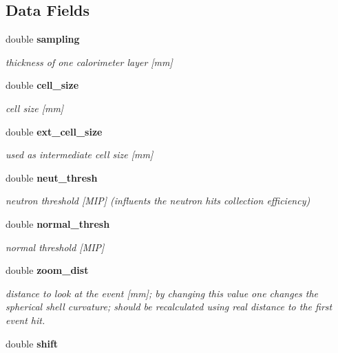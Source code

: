\subsection*{Data Fields}
\begin{DoxyCompactItemize}
\item 
double {\bf sampling}\label{classDeepAnalysis_1_1Detector_a5d4e2fd38f01156c20f84816433b369d}

\begin{DoxyCompactList}\small\item\em thickness of one calorimeter layer [mm] \end{DoxyCompactList}\item 
double {\bf cell\-\_\-size}\label{classDeepAnalysis_1_1Detector_afabe7007b58b1375246c18dd7d9d20d3}

\begin{DoxyCompactList}\small\item\em cell size [mm] \end{DoxyCompactList}\item 
double {\bf ext\-\_\-cell\-\_\-size}\label{classDeepAnalysis_1_1Detector_a314297278178abfed53b28212aaf3403}

\begin{DoxyCompactList}\small\item\em used as intermediate cell size [mm] \end{DoxyCompactList}\item 
double {\bf neut\-\_\-thresh}\label{classDeepAnalysis_1_1Detector_a114be573c7073f49bf04b1998ba7b87b}

\begin{DoxyCompactList}\small\item\em neutron threshold [M\-I\-P] (influents the neutron hits collection efficiency) \end{DoxyCompactList}\item 
double {\bf normal\-\_\-thresh}\label{classDeepAnalysis_1_1Detector_a5f70ea7b0b17eade3462cf0da58e7655}

\begin{DoxyCompactList}\small\item\em normal threshold [M\-I\-P] \end{DoxyCompactList}\item 
double {\bf zoom\-\_\-dist}
\begin{DoxyCompactList}\small\item\em distance to look at the event [mm]; by changing this value one changes the spherical shell curvature; should be recalculated using real distance to the first event hit. \end{DoxyCompactList}\item 
double {\bf shift}\label{classDeepAnalysis_1_1Detector_a9d492b2a1c405d6eea0c7c7273d87e18}


\end{DoxyCompactItemize}
